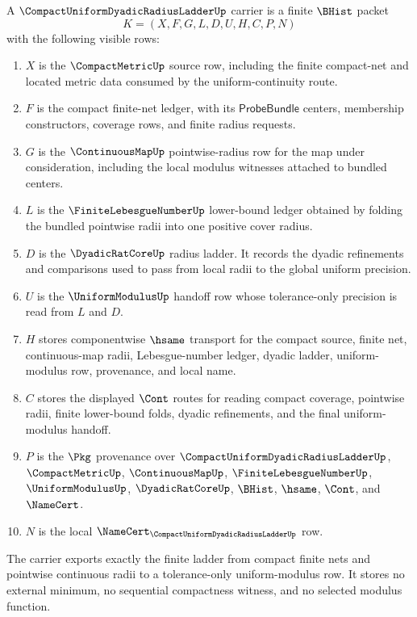 \begin{definition}
\label{def:compact-uniform-dyadic-radius-ladder}
A $\CompactUniformDyadicRadiusLadderUp$ carrier is a finite $\BHist$ packet
$$
K=(X,F,G,L,D,U,H,C,P,N)
$$
with the following visible rows:
\begin{enumerate}
\item $X$ is the $\CompactMetricUp$ source row, including the finite compact-net and located metric data consumed by the uniform-continuity route.
\item $F$ is the compact finite-net ledger, with its $\mathsf{ProbeBundle}$ centers, membership constructors, coverage rows, and finite radius requests.
\item $G$ is the $\ContinuousMapUp$ pointwise-radius row for the map under consideration, including the local modulus witnesses attached to bundled centers.
\item $L$ is the $\FiniteLebesgueNumberUp$ lower-bound ledger obtained by folding the bundled pointwise radii into one positive cover radius.
\item $D$ is the $\DyadicRatCoreUp$ radius ladder. It records the dyadic refinements and comparisons used to pass from local radii to the global uniform precision.
\item $U$ is the $\UniformModulusUp$ handoff row whose tolerance-only precision is read from $L$ and $D$.
\item $H$ stores componentwise $\hsame$ transport for the compact source, finite net, continuous-map radii, Lebesgue-number ledger, dyadic ladder, uniform-modulus row, provenance, and local name.
\item $C$ stores the displayed $\Cont$ routes for reading compact coverage, pointwise radii, finite lower-bound folds, dyadic refinements, and the final uniform-modulus handoff.
\item $P$ is the $\Pkg$ provenance over $\CompactUniformDyadicRadiusLadderUp$, $\CompactMetricUp$, $\ContinuousMapUp$, $\FiniteLebesgueNumberUp$, $\UniformModulusUp$, $\DyadicRatCoreUp$, $\BHist$, $\hsame$, $\Cont$, and $\NameCert$.
\item $N$ is the local $\NameCert_{\CompactUniformDyadicRadiusLadderUp}$ row.
\end{enumerate}
The carrier exports exactly the finite ladder from compact finite nets and pointwise continuous radii to a tolerance-only uniform-modulus row. It stores no external minimum, no sequential compactness witness, and no selected modulus function.
\end{definition}

